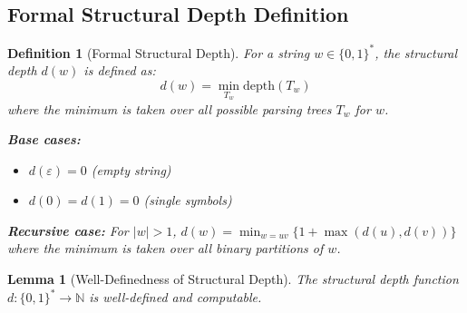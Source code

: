 \documentclass[11pt]{article}
\newtheorem{definition}{Definition}
\newtheorem{lemma}{Lemma}
\begin{document}
\subsection{Formal Structural Depth Definition}

\begin{definition}[Formal Structural Depth]
For a string $w \in \{0,1\}^*$, the structural depth $d(w)$ is defined as:
$$d(w) = \min_{T_w} \text{depth}(T_w)$$
where the minimum is taken over all possible parsing trees $T_w$ for $w$.

\textbf{Base cases:}
\begin{itemize}
\item $d(\varepsilon) = 0$ (empty string)
\item $d(0) = d(1) = 0$ (single symbols)
\end{itemize}

\textbf{Recursive case:}
For $|w| > 1$, $d(w) = \min_{w=uv} \{1 + \max(d(u), d(v))\}$ where the minimum is taken over all binary partitions of $w$.
\end{definition}

\begin{lemma}[Well-Definedness of Structural Depth]
The structural depth function $d: \{0,1\}^* \to \mathbb{N}$ is well-defined and computable.
\end{lemma}
\end{document}
